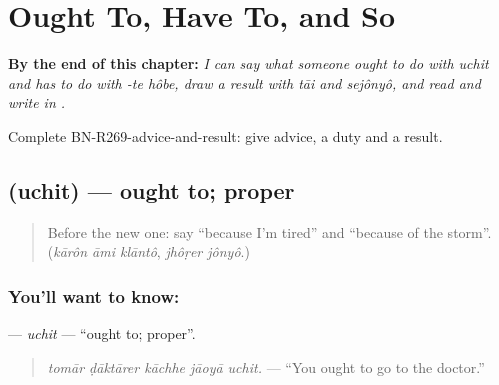 
\chapter{Ought To, Have To, and So}
\label{ch:bn-ought-to-have-to-and-so}

\begin{chapteropening}
\textbf{By the end of this chapter:} \emph{I can say what someone ought to do with uchit and has to do with -te hôbe, draw a result with tāi and sejônyô, and read and write  in .}

Complete BN-R269-advice-and-result: give advice, a duty and a result.
\end{chapteropening}

\section[\texorpdfstring{\bn{উচিত} (uchit)}{উচিত (uchit)}]{ (uchit) — ought to; proper}

\label{lesson:BN-C269-uchit}



\begin{quote}
Before the new one: say \textquotedblleft{}because I'm tired\textquotedblright{} and \textquotedblleft{}because of the storm\textquotedblright{}. (\emph{kārôn āmi klāntô}, \emph{jhôṛer jônyô}.)
\end{quote}

\subsection*{You'll want to know: }
\textbf{} — \emph{uchit} — \textquotedblleft{}ought to; proper\textquotedblright{}.

\begin{quote}
\textbf{    }
\end{quote}

\begin{quote}
\emph{tomār ḍāktārer kāchhe jāoyā uchit.} — \textquotedblleft{}You ought to go to the doctor.\textquotedblright{}
\end{quote}

